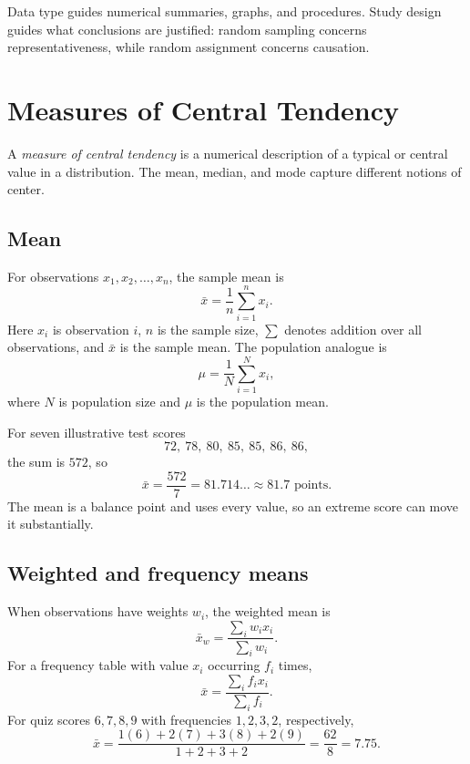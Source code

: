 \documentclass[11pt]{article}
\begin{document}
\begin{keybox}
Data type guides numerical summaries, graphs, and procedures.  Study design
guides what conclusions are justified: random sampling concerns
representativeness, while random assignment concerns causation.
\end{keybox}

\section{Measures of Central Tendency}\label{sec:center}
A \emph{measure of central tendency} is a numerical description of a typical
or central value in a distribution.  The mean, median, and mode capture
different notions of center.

\subsection{Mean}
For observations $x_1,x_2,\ldots,x_n$, the sample mean is
\begin{equation}\label{eq:mean}
 \bar{x}=\frac{1}{n}\sum_{i=1}^{n}x_i.
\end{equation}
Here $x_i$ is observation $i$, $n$ is the sample size, $\sum$ denotes
addition over all observations, and $\bar{x}$ is the sample mean.  The
population analogue is
\[
\mu=\frac{1}{N}\sum_{i=1}^{N}x_i,
\]
where $N$ is population size and $\mu$ is the population mean.

For seven illustrative test scores
\[
72,\ 78,\ 80,\ 85,\ 85,\ 86,\ 86,
\]
the sum is $572$, so
\[
 \bar{x}=\frac{572}{7}=81.714\ldots\approx81.7\text{ points}.
\]
The mean is a balance point and uses every value, so an extreme score can
move it substantially.

\subsection{Weighted and frequency means}
When observations have weights $w_i$, the weighted mean is
\begin{equation}\label{eq:weighted-mean}
\bar{x}_w=\frac{\sum_i w_i x_i}{\sum_i w_i}.
\end{equation}
For a frequency table with value $x_i$ occurring $f_i$ times,
\begin{equation}\label{eq:freq-mean}
\bar{x}=\frac{\sum_i f_i x_i}{\sum_i f_i}.
\end{equation}
For quiz scores $6,7,8,9$ with frequencies $1,2,3,2$, respectively,
\[
\bar{x}=\frac{1(6)+2(7)+3(8)+2(9)}{1+2+3+2}
       =\frac{62}{8}=7.75.
\]
\end{document}
